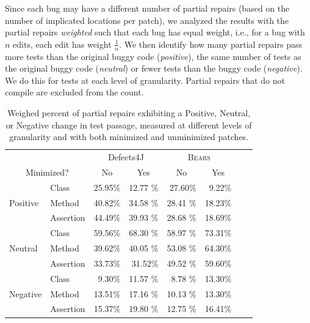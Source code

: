 \documentclass[10pt, conference]{IEEEtran}
\newcommand\bears{\textsc{Bears}\xspace}
\begin{document}
Since each bug may have a different 
number of partial repairs (based on the number of implicated locations per
patch), we analyzed the results with the partial repairs \emph{weighted} such that each bug
has equal weight, i.e., for a bug with $n$ edits, each edit has weight 
$\frac{1}{n}$.  We then identify how many partial repairs pass more tests
than the original buggy code (\emph{positive}), the  same number of tests as the
original buggy code (\emph{neutral}) or fewer tests than the buggy code
(\emph{negative}).  We do this for tests at each level of granularity.  Partial
repairs that do not compile are
excluded from the count. 




\begin{table}
{\begin{center}
\begin{tabular}{ll|rr|rrrr}
\toprule
\multicolumn{2}{c}{}&\multicolumn{2}{c}{Defects4J} & \multicolumn{2}{c}{\bears} \\
\multicolumn{2}{c}{Minimized?} & \multicolumn{1}{c}{No} & \multicolumn{1}{c}{Yes} & \multicolumn{1}{c}{No} & \multicolumn{1}{c}{Yes}  \\
\midrule
\multirow{3}{*}{Positive} & Class & 25.95\% & 12.77 \% & 27.60\% & 9.22\%  \\
 & Method & 40.82\% & 34.58 \% & 28.41 \% & 18.23\%  \\
 & Assertion & 44.49\% & 39.93 \% & 28.68 \% & 18.69\%  \\ 
\midrule
\multirow{3}{*}{Neutral} & Class & 59.56\% & 68.30 \% & 58.97 \% & 73.31\% \\
 & Method & 39.62\% & 40.05 \% & 53.08 \% & 64.30\%  \\
 & Assertion & 33.73\% & 31.52\% & 49.52 \% &  59.60\%  \\ 
\midrule
\multirow{3}{*}{Negative} & Class & 9.30\% & 11.57 \% & 8.78 \% & 13.30\%  \\
 & Method & 13.51\% & 17.16 \% & 10.13 \% & 13.30\%  \\
 & Assertion & 15.37\% & 19.80 \% & 12.75 \% &  16.41\%  \\ 
\bottomrule
\end{tabular}
\end{center}}
\caption{Weighed percent of partial repairs exhibiting a {\normalfont Positive}, {\normalfont Neutral},
	or {\normalfont Negative} change in test passage, measured at different levels of granularity
	and with both minimized and unminimized patches.}
\label{yiweitable}
\end{table}
\end{document}
